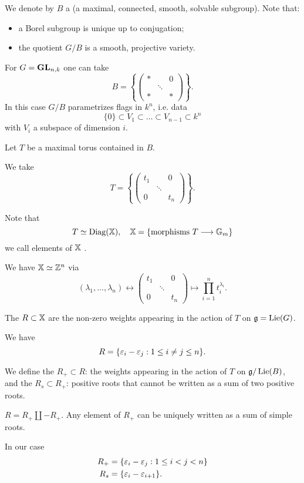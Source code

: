 We denote by $B$ a  (a maximal, connected, smooth, solvable subgroup). Note that:
\begin{itemize}
	\item a Borel subgroup is unique up to conjugation;
	\item the quotient $G /B$ is a smooth, projective variety.
\end{itemize}
\begin{example}
	 For $G=\mathbf{GL}_{n,k}$ one can take
	 \[
		 B = \left\{ \begin{pmatrix} * & & 0 \\ & \ddots & \\ * & & *\end{pmatrix}  \right\} .
	 \] 
	 In this case $G /B$ parametrizes flags in $k^{n}$, i.e. data
	 \[
	  \{0\} \subset V_1\subset \dots\subset V_{n-1}\subset k^{n}
	 \]
	 with $V_i$ a subspace of dimension $i$.
\end{example}
Let $T$ be a maximal torus contained in $B$. 
\begin{example}
	We take
	\[
		T = \left\{ \begin{pmatrix} t_1 & & 0 \\ & \ddots \\ 0 & & t_n \end{pmatrix}  \right\} .
	\] 
\end{example}
Note that
\[
T\isoto \Diag(\XX),\quad \XX = \{\text{morphisms }T\to \Gm\} 
\] 
we call elements of $\mathbb{X}$ . 
\begin{example}
	We have $\mathbb{X}\simeq \mathbb Z^{n}$ via
	\[
		(\lambda_1,\dots,\lambda_n) \leftrightarrow \begin{pmatrix} t_1 & & 0 \\ & \ddots \\ 0 & & t_n \end{pmatrix} \mapsto \prod_{i=1}^{n} t_i^{\lambda_i} .
	\] 
\end{example}
The  $R\subset \mathbb{X}$ are the non-zero weights appearing in the action of $T$ on $\mathfrak g=\operatorname{Lie}(G)$. \begin{example}
	We have
	\[
		R = \{\varepsilon_i - \varepsilon_j: 1\le i\neq j \le n\} .
	\] 
\end{example}
We define the  $R_+\subset R$: the weights appearing in the action of $T$ on $\mathfrak g /\operatorname{Lie}(B)$, and the  $R_s\subset R_+$: positive roots that cannot be written as a sum of two positive roots.
\begin{note}
	$R=R_+ \coprod -R_{+}$. Any element of $R_+$ can be uniquely written as a sum of simple roots.
\end{note}
\begin{example}
	In our case
	\begin{align*}
		R_+ &= \{\varepsilon_i - \varepsilon_j:1\le i<j<n\} \\
		R_s &= \{\varepsilon_i - \varepsilon_{i+1}\} .
	\end{align*}
\end{example}

